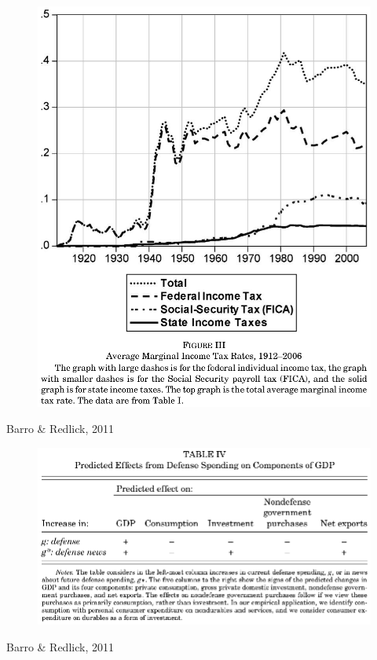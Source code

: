 \documentclass{beamer}
\begin{document}
\begin{frame}
  \begin{figure}
    \includegraphics[scale=.5]{barro_redlick3.eps}
  \end{figure}
  Barro \& Redlick, 2011
\end{frame}

\begin{frame}
  \begin{figure}
    \includegraphics[scale=.6]{barro_redlick4.eps}
  \end{figure}
  Barro \& Redlick, 2011
\end{frame}
\end{document}
